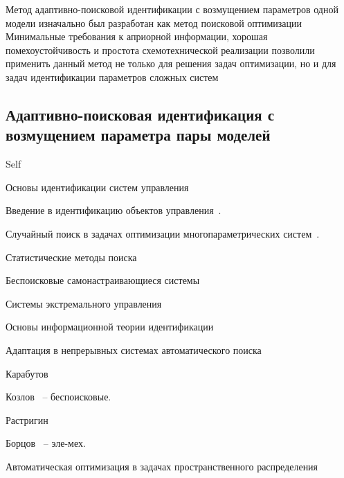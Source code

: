 Метод адаптивно-поисковой идентификации с возмущением параметров одной модели
изначально был разработан как метод поисковой оптимизации
\cite{mich_92}
Минимальные требования к априорной информации, хорошая помехоустойчивость и
простота схемотехнической реализации позволили применить данный метод не только
для решения задач оптимизации, но и для задач идентификации параметров сложных
систем



\subsection{Адаптивно-поисковая идентификация с возмущением параметра пары моделей} %
 Self

Основы идентификации систем управления~\cite{eykhoff_id_base,eykhoff_modern_id,gropp_methods_id,deith_method_id_ds,lung_id_sys,seidg_id_su,leondes_modern_tu,nelles_nlsys_id}

Введение в идентификацию объектов управления~\cite{rastr_intro,rastr_adop_complex_sys}.

Случайный поиск в задачах оптимизации многопараметрических систем~\cite{rastr_rand_search,rastr_rand_search_adopt}.

Статистические методы поиска~\cite{rastr_stat_meth_search}

Беспоисковые самонастраивающиеся системы~\cite{kozlov_nosearch_sns}

Системы экстремального управления~\cite{rastr_seu,kras_dyn_nsn}

Основы информационной теории идентификации~\cite{info_cipkin,straton_inf,karabut}

Адаптация в непрерывных системах автоматического поиска~\cite{adopt_cont_sys}

Карабутов~\cite{karabutov_adapt_id_sys,saliga_id_ctl_black}

Козлов~\cite{kozlov_nosearch_sns} -- беспоисковые.

Растригин~\cite{rastr_stat_meth_search,rastr_seu,rastr_intro,rastr_adop_complex_sys,rastr_rand_search}

Борцов~\cite{borcov} -- эле-мех.

Автоматическая оптимизация в задачах пространственного распределения~\cite{auto_optim_intask}




